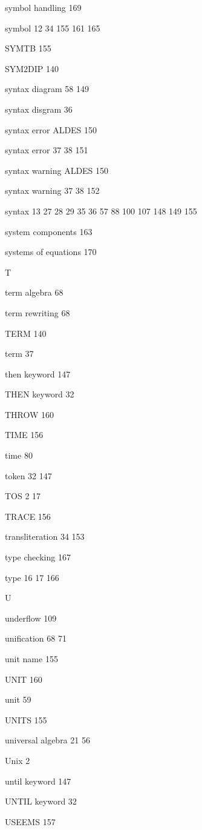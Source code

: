 \item symbol handling 169
\item symbol  12 34 155 161 165
\item SYMTB 155
\item SYM2DIP 140
\item syntax diagram  58 149
\item syntax disgram 36
\item syntax error ALDES 150
\item syntax error  37 38 151
\item syntax warning ALDES 150
\item syntax warning  37 38 152
\item syntax  13 27 28 29 35 36 57 88 100 107 148 149 155
\item system components 163
\item systems of equations 170
\indexspace
\item {\Large T}
\item term algebra 68
\item term rewriting 68
\item TERM 140
\item term 37
\item then keyword 147
\item THEN keyword 32
\item THROW 160
\item TIME 156
\item time 80
\item token  32 147
\item TOS  2 17
\item TRACE 156
\item transliteration  34 153
\item type checking 167
\item type  16 17 166
\indexspace
\item {\Large U}
\item underflow 109
\item unification  68 71
\item unit name 155
\item UNIT 160
\item unit 59
\item UNITS 155
\item universal algebra  21 56
\item Unix 2
\item until keyword 147
\item UNTIL keyword 32
\item USEEMS 157
\indexspace
